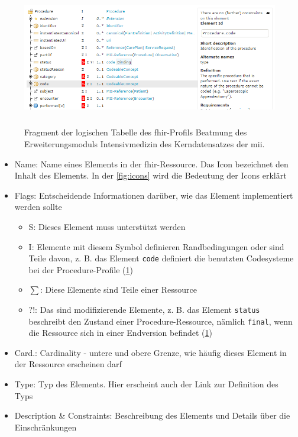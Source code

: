 \begin{figure}[ht]
	\centering
	\includegraphics[height=6cm]{figures/beatmung}
	\caption[Logische Tabelle eines \acs{fhir}-Profils]{Fragment der logischen Tabelle des \acs{fhir}-Profils \glqq Beatmung\grqq{} des Erweiterungsmoduls \glqq Intensivmedizin\grqq{} des Kerndatensatzes der \acs{mii}.}
	\label{fig:logic-table}
\end{figure}

\begin{itemize}
	\item Name: Name eines Elements in der \ac{fhir}-Ressource. Das Icon bezeichnet den Inhalt des Elements. In der \ref{fig:icons} wird die Bedeutung der Icons erklärt
	\item Flags: Entscheidende Informationen darüber, wie das Element implementiert werden sollte
	\begin{itemize}
		\item S: Dieses Element muss unterstützt werden
		\item I: Elemente mit diesem Symbol definieren Randbedingungen oder sind Teile davon, z. B. das Element \texttt{code} definiert die benutzten Codesysteme bei der \glqq Procedure\grqq{}-Profile (\ref{fig:logic-table})
		\item $\sum$: Diese Elemente sind Teile einer Ressource
		\item ?!: Das sind modifizierende Elemente, z. B. das Element \texttt{status} beschreibt den Zustand einer \glqq Procedure\grqq{}-Ressource, nämlich \texttt{final}, wenn die Ressource sich in einer Endversion befindet (\ref{fig:logic-table})
	\end{itemize}
	\item Card.: Cardinality - untere und obere Grenze, wie häufig dieses Element in der Ressource erscheinen darf
	\item Type: Typ des Elements. Hier erscheint auch der Link zur Definition des Typs
	\item Description \& Constraints: Beschreibung des Elements und Details über die Einschränkungen
\end{itemize}

